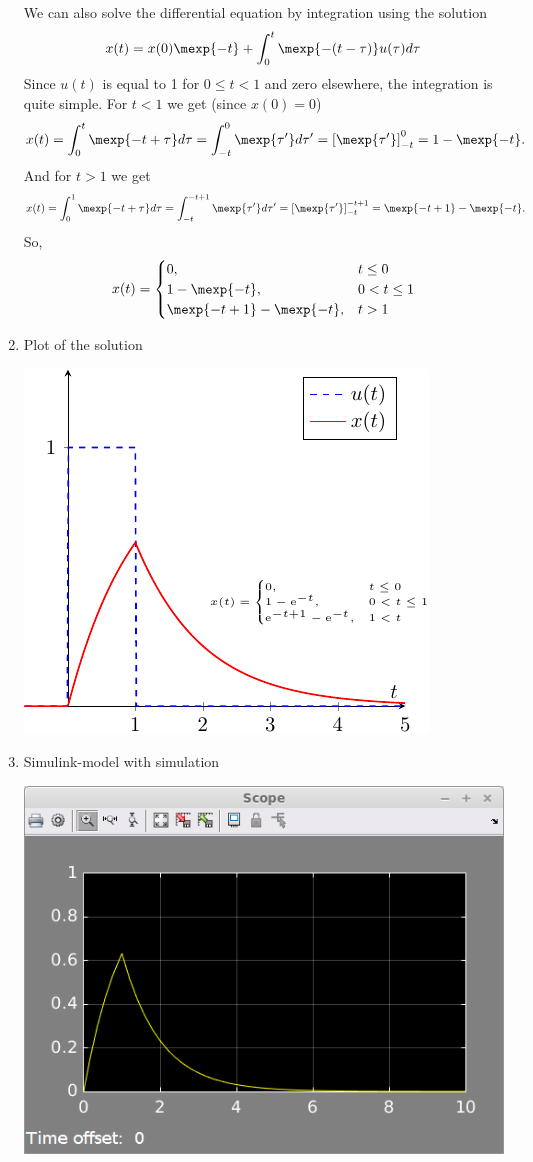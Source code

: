 \documentclass{scrartcl}
\begin{document}
\begin{enumerate}
      We can also solve the differential equation by integration using the solution
      \[ x(t) = x(0)\mexp{-t} + \int_0^t \mexp{-(t-\tau)} u(\tau) d\tau \]
      Since \(u(t)\) is equal to 1 for \(0\le t< 1\) and zero elsewhere, the integration is quite simple. For $t<1$ we get (since \(x(0) = 0\)) 
      \[ x(t) = \int_0^t \mexp{-t+\tau}d\tau  
              = \int_{-t}^{0} \mexp{\tau'} d\tau' = \left[ \mexp{\tau'} \right]_{-t}^{0} = 1-\mexp{-t}. \]
      And for $t>1$ we get 
      \[ x(t) = \int_0^1 \mexp{-t+\tau}d\tau  
              = \int_{-t}^{-t+1} \mexp{\tau'} d\tau' = \left[ \mexp{\tau'} \right]_{-t}^{-t+1} = \mexp{-t+1}-\mexp{-t}. \]
      So,
      \[ x(t) = \begin{cases} 0, & t \le 0\\
                              1-\mexp{-t}, & 0<t\le 1\\
                              \mexp{-t+1}-\mexp{-t}, & t>1 \end{cases} \]
\item Plot of the solution
      \begin{center}
      \includegraphics{first-order-response-bb}
      \end{center}
\item Simulink-model with simulation
      \begin{center}
      \includegraphics[width=0.5\linewidth]{first-order-simulink}
      \end{center}
\end{enumerate}


     


     
      
\end{document}
